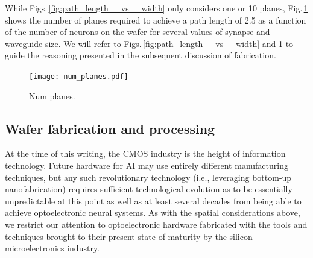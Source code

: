 \documentclass[twocolumn]{article}
\begin{document}
While Figs.\,\ref{fig:path_length__vs__width} only considers one or 10 planes, Fig.\,\ref{fig:num_planes} shows the number of planes required to achieve a path length of 2.5 as a function of the number of neurons on the wafer for several values of synapse and waveguide size. We will refer to Figs.\,\ref{fig:path_length__vs__width} and \ref{fig:num_planes} to guide the reasoning presented in the subsequent discussion of fabrication.
\begin{figure}
    \centering
    \texttt{[image: num\_planes.pdf]} 
    \caption{Num planes.}
    \label{fig:num_planes}
\end{figure}


\subsection{Wafer fabrication and processing}
\label{sec:fabrication}
At the time of this writing, the CMOS industry is the height of information technology. Future hardware for AI may use entirely different manufacturing techniques, but any such revolutionary technology (i.e., leveraging bottom-up nanofabrication) requires sufficient technological evolution as to be essentially unpredictable at this point as well as at least several decades from being able to achieve optoelectronic neural systems. As with the spatial considerations above, we restrict our attention to optoelectronic hardware fabricated with the tools and techniques brought to their present state of maturity by the silicon microelectronics industry.
\end{document}
